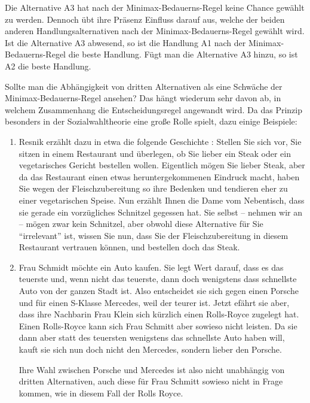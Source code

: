 Die Alternative A3 hat nach der Minimax-Be\-dau\-erns-Re\-gel keine Chance
ge\-wählt zu werden. Dennoch übt ihre Präsenz Einfluss darauf aus, welche der beiden
anderen Handlungsalternativen nach der Minimax-Bedauerns-Regel gewählt wird. Ist
die Alternative A3 abwesend, so ist die Handlung A1 nach der
Minimax-Bedauerns-Regel die beste Handlung. Fügt man die Alternative A3 hinzu, so
ist A2 die beste Handlung.

Sollte man die Abhängigkeit von dritten Alternativen als eine Schwäche der
Minimax-Bedauerns-Regel ansehen? Das hängt wiederum sehr davon ab, in welchem
Zusammenhang die Entscheidungsregel angewandt wird. Da das Prinzip besonders in
der Sozialwahltheorie eine große Rolle spielt, dazu einige Beispiele:

\begin{enumerate}
\label{dritteAlternativen}
  \item Resnik erzählt dazu in etwa die folgende Geschichte \cite[S. 40]{resnik:1987}:
Stellen Sie sich vor, Sie sitzen in einem Restaurant und überlegen, ob Sie lieber
ein Steak oder ein vegetarisches Gericht bestellen wollen. Eigentlich mögen Sie
lieber Steak, aber da das Restaurant einen etwas heruntergekommenen Eindruck
macht, haben Sie wegen der Fleischzubereitung so ihre Bedenken und tendieren eher
zu einer vegetarischen Speise. Nun erzählt Ihnen die Dame vom Nebentisch, dass
sie gerade ein vorzügliches Schnitzel gegessen hat. Sie selbst -- nehmen wir an
-- mögen zwar kein Schnitzel, aber obwohl diese Alternative für Sie
"`irrelevant"' ist, wissen Sie nun, dass Sie der Fleischzubereitung in diesem
Restaurant vertrauen können, und bestellen doch das Steak.

  \item Frau Schmidt möchte ein Auto kaufen. Sie legt Wert darauf, dass es das
  teuerste und, wenn nicht das teuerste, dann doch wenigstens dass schnellste
  Auto von der ganzen Stadt ist. Also entscheidet sie sich gegen einen Porsche
  und für einen S-Klasse Mercedes, weil der teurer ist. Jetzt efährt sie aber,
  dass ihre Nachbarin Frau Klein sich kürzlich einen Rolls-Royce zugelegt hat. 
  Einen Rolls-Royce kann sich Frau Schmitt aber sowieso nicht leisten. Da sie
  dann aber statt des teuersten wenigstens das schnellste Auto haben will,
  kauft sie sich nun doch nicht den Mercedes, sondern lieber den Porsche.

  Ihre Wahl zwischen Porsche und Mercedes ist also nicht unabhängig von dritten
  Alternativen, auch diese für Frau Schmitt sowieso nicht in Frage kommen, wie in
  diesem Fall der Rolls Royce.
  

\end{enumerate}
